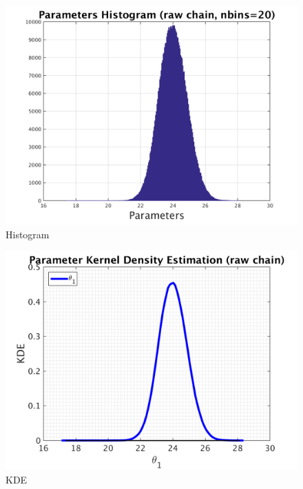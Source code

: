 \begin{figure}[H]
  
  \centering
   \includegraphics[scale=0.75]{100_results/outputData_10/simple_ip_hist_raw}
   \caption{Histogram}
\end{figure}



\begin{figure}[H]
  
  \centering
   \includegraphics[scale=0.75]{100_results/outputData_10/simple_ip_kde_raw}
   \caption{ KDE }
\end{figure}

